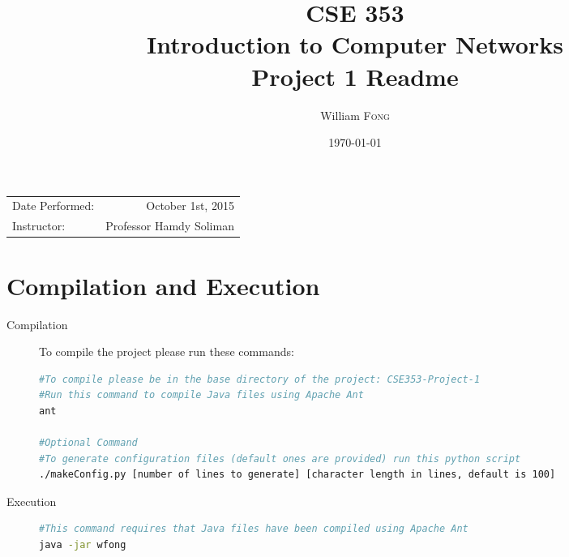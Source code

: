 \documentclass{article}
\title{CSE 353 \\ Introduction to Computer Networks \\ Project 1 Readme} %
\author{William \textsc{Fong}} %
\date{\today} %
\begin{document}
\maketitle %

\begin{center}
\begin{tabular}{l r}
Date Performed: & October 1st, 2015 \\ %
Instructor: & Professor Hamdy Soliman %
\end{tabular}
\end{center}



\section{Compilation and Execution}
\begin{description}
\item[Compilation]
To compile the project please run these commands:
\begin{lstlisting}[language=bash, caption=Order and Description of Command for Compilation]
#To compile please be in the base directory of the project: CSE353-Project-1
#Run this command to compile Java files using Apache Ant
ant

#Optional Command
#To generate configuration files (default ones are provided) run this python script
./makeConfig.py [number of lines to generate] [character length in lines, default is 100]
\end{lstlisting}
\item[Execution]
\begin{lstlisting}[language=bash, caption=To Execute Program]
#This command requires that Java files have been compiled using Apache Ant
java -jar wfong
\end{lstlisting}
\end{description}

\end{document}
